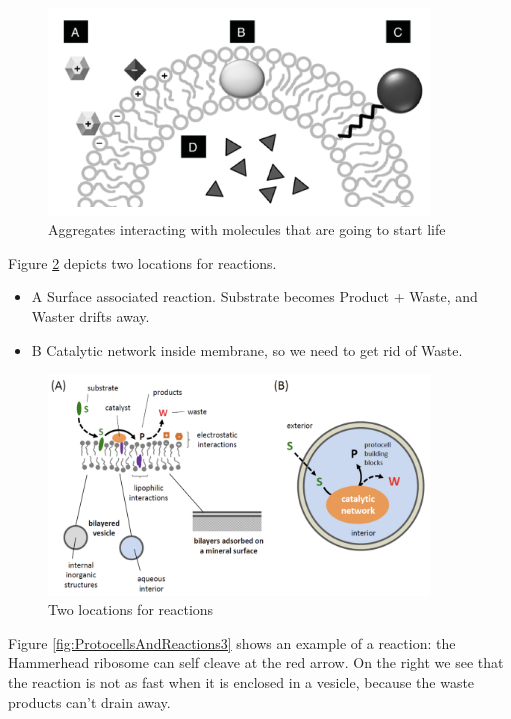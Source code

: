 \documentclass[]{article}
\begin{document}
\begin{figure}[H]
	\caption{Aggregates interacting with molecules that are going to start life}\label{fig:ProtocellsAndReactions1}
	\includegraphics[width=0.9\textwidth]{ProtocellsAndReactions1}
\end{figure}

Figure \ref{fig:ProtocellsAndReactions2} depicts two locations for reactions.
\begin{itemize}
	\item A Surface associated reaction. Substrate becomes Product + Waste, and Waster drifts away. 
	\item B Catalytic network inside membrane, so we need to get rid of Waste.
\end{itemize}
\begin{figure}[H]
	\caption{Two locations for reactions}\label{fig:ProtocellsAndReactions2}
	\includegraphics[width=0.9\textwidth]{ProtocellsAndReactions2}
\end{figure}

Figure \ref{fig:ProtocellsAndReactions3} shows an example of a reaction:  the Hammerhead ribosome can self cleave at the red arrow. On the right we see that the reaction is not as fast when it is enclosed in a vesicle, because the waste products can't drain away.
\end{document}
